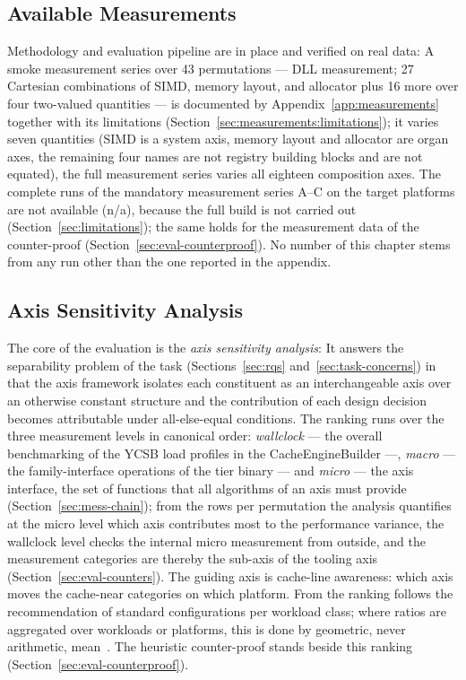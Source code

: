 \subsection{Available Measurements}\label{sec:eval-available}
Methodology and evaluation pipeline are in place and verified on real data: A smoke measurement
series over 43 permutations --- DLL measurement; 27 Cartesian combinations of SIMD, memory layout,
and allocator plus 16 more over four two-valued quantities --- is documented by
Appendix~\ref{app:measurements} together with its limitations
(Section~\ref{sec:measurements:limitations}); it varies seven quantities (SIMD is a system axis,
memory layout and allocator are organ axes, the remaining four names are not registry building
blocks and are not equated), the full measurement series varies all eighteen composition axes. The
complete runs of the mandatory measurement series A--C on the target platforms are not available
(n/a), because the full build is not carried out (Section~\ref{sec:limitations}); the same holds for
the measurement data of the counter-proof (Section~\ref{sec:eval-counterproof}). No number of this
chapter stems from any run other than the one reported in the appendix.


\subsection{Axis Sensitivity Analysis}\label{sec:eval-sensitivity}
The core of the evaluation is the \emph{axis sensitivity analysis}: It answers the separability
problem of the task (Sections~\ref{sec:rqs} and~\ref{sec:task-concerns}) in that the axis framework
isolates each constituent as an interchangeable axis over an otherwise constant structure and the
contribution of each design decision becomes attributable under all-else-equal conditions. The
ranking runs over the three measurement levels in canonical order: \emph{wallclock} --- the overall
benchmarking of the YCSB load profiles in the CacheEngineBuilder ---, \emph{macro} --- the
family-interface operations of the tier binary --- and \emph{micro} --- the axis interface, the set of
functions that all algorithms of an axis must provide (Section~\ref{sec:mess-chain}); from the rows
per permutation the analysis quantifies at the micro level which axis contributes most to the
performance variance, the wallclock level checks the internal micro measurement from outside, and
the measurement categories are thereby the sub-axis of the tooling axis
(Section~\ref{sec:eval-counters}). The guiding axis is cache-line awareness: which axis moves the
cache-near categories on which platform. From the ranking follows the recommendation of standard
configurations per workload class; where ratios are aggregated over workloads or platforms, this is
done by geometric, never arithmetic, mean~\cite{fleming1986statistics}. The heuristic counter-proof
stands beside this ranking (Section~\ref{sec:eval-counterproof}).

